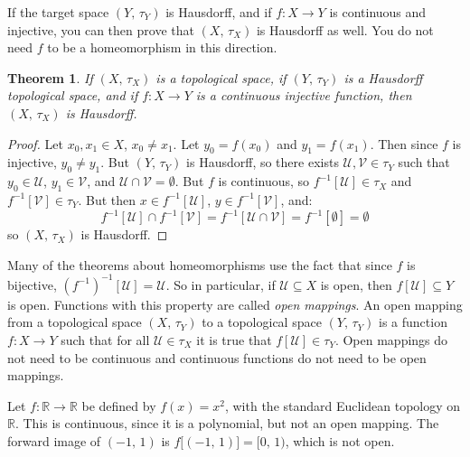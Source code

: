 \documentclass{article}
\theoremstyle{plain}
\newtheorem{theorem}{Theorem}[section]
\theoremstyle{normal}
\newenvironment{example}{%
    \pushQED{\qed}\renewcommand{\qedsymbol}{$\blacksquare$}\examplex%
}{%
    \popQED\endexamplex%
}
\newenvironment{definition}{%
    \pushQED{\qed}\renewcommand{\qedsymbol}{$\blacksquare$}\definitionx%
}{%
    \popQED\enddefinitionx%
}
\begin{document}
        If the target space $(Y,\,\tau_{Y})$ is Hausdorff, and if
        $f:X\rightarrow{Y}$ is continuous and injective, you can then prove that
        $(X,\,\tau_{X})$ is Hausdorff as well. You do not need $f$ to be a
        homeomorphism in this direction.
        \begin{theorem}
            If $(X,\,\tau_{X})$ is a topological space, if $(Y,\,\tau_{Y})$ is a
            Hausdorff topological space, and if $f:X\rightarrow{Y}$ is a
            continuous injective function, then $(X,\,\tau_{X})$ is Hausdorff. 
        \end{theorem}
        \begin{proof}
            Let $x_{0},x_{1}\in{X}$, $x_{0}\ne{x}_{1}$. Let
            $y_{0}=f(x_{0})$ and $y_{1}=f(x_{1})$. Then since $f$ is injective,
            $y_{0}\ne{y}_{1}$. But $(Y,\,\tau_{Y})$ is Hausdorff, so there
            exists $\mathcal{U},\mathcal{V}\in\tau_{Y}$ such that
            $y_{0}\in\mathcal{U}$, $y_{1}\in\mathcal{V}$, and
            $\mathcal{U}\cap\mathcal{V}=\emptyset$. But $f$ is continuous,
            so $f^{-1}[\mathcal{U}]\in\tau_{X}$ and
            $f^{-1}[\mathcal{V}]\in\tau_{Y}$. But then
            $x\in{f}^{-1}[\mathcal{U}]$, $y\in{f}^{-1}[\mathcal{V}]$, and:
            \begin{equation}
                f^{-1}[\mathcal{U}]\cap{f}^{-1}[\mathcal{V}]
                =f^{-1}[\mathcal{U}\cap\mathcal{V}]
                =f^{-1}[\emptyset]
                =\emptyset
            \end{equation}
            so $(X,\,\tau_{X})$ is Hausdorff.
        \end{proof}
        Many of the theorems about homeomorphisms use the fact that since
        $f$ is bijective, $(f^{-1})^{-1}[\mathcal{U}]=\mathcal{U}$. So in
        particular, if $\mathcal{U}\subseteq{X}$ is open, then
        $f[\mathcal{U}]\subseteq{Y}$ is open. Functions with this property
        are called \textit{open mappings}.
        \begin{definition}[\textbf{Open Mapping}]
            An open mapping from a topological space $(X,\,\tau_{Y})$ to a
            topological space $(Y,\,\tau_{Y})$ is a function
            $f:X\rightarrow{Y}$ such that for all $\mathcal{U}\in\tau_{X}$ it is
            true that $f[\mathcal{U}]\in\tau_{Y}$.
        \end{definition}
        Open mappings do not need to be continuous and continuous functions do
        not need to be open mappings.
        \begin{example}
            Let $f:\mathbb{R}\rightarrow\mathbb{R}$ be defined by
            $f(x)=x^{2}$, with the standard Euclidean topology on $\mathbb{R}$.
            This is continuous, since it is a polynomial, but not an open
            mapping. The forward image of $(-1,\,1)$ is
            $f\big[(-1,\,1)\big]=[0,\,1)$, which is not open.
        \end{example}
\end{document}
